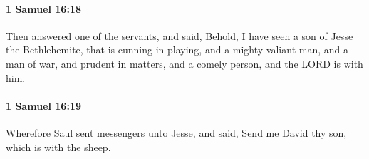 		\paragraph{1 Samuel 16:18} %
			\label{1SAMUEL-16-18}

			Then answered one of the servants, and said, Behold, I have seen a son of Jesse the Bethlehemite, that is cunning in playing, and a mighty valiant man, and a man of war, and prudent in matters, and a comely person, and the LORD is with him.


		\paragraph{1 Samuel 16:19} %
			\label{1SAMUEL-16-19}

			Wherefore Saul sent messengers unto Jesse, and said, Send me David thy son, which is with the sheep.


